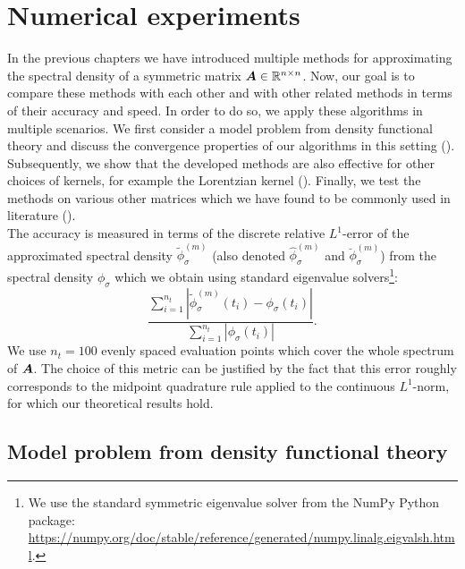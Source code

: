 \chapter{Numerical experiments}
\label{chp:5-experiments}

In the previous chapters we have introduced multiple methods for approximating the
spectral density of a symmetric matrix $\boldsymbol{A} \in \mathbb{R}^{n \times n}$. Now,
our goal is to compare these methods with each other and with other related methods
in terms of their accuracy and speed. In order to do so, we apply these algorithms
in multiple scenarios. We first consider a model problem from density functional theory
\cite{lin2017randomized} and discuss the convergence properties of our algorithms
in this setting (). Subsequently,
we show that the developed methods are also effective for other choices of
kernels, for example the Lorentzian kernel ().
Finally, we test the methods on various other matrices which we have found to
be commonly used in literature ().\\

The accuracy is measured in terms of the discrete relative $L^1$-error of the approximated
spectral density $\widetilde{\phi}_{\sigma}^{(m)}$ (also denoted $\widehat{\phi}_{\sigma}^{(m)}$ and
$\breve{\phi}_{\sigma}^{(m)}$) from the spectral density $\phi_{\sigma}$
which we obtain using standard eigenvalue solvers\footnote{We use the
standard symmetric eigenvalue solver from the NumPy Python package: \url{https://numpy.org/doc/stable/reference/generated/numpy.linalg.eigvalsh.html}.}:
\begin{equation}
    \frac{\sum_{i=1}^{n_t} |\widetilde{\phi}_{\sigma}^{(m)}(t_i) - \phi_{\sigma}(t_i)|}{\sum_{i=1}^{n_t} |\phi_{\sigma}(t_i)|}.
    \label{equ:5-experiments-L1-error}
\end{equation}
We use $n_t=100$ evenly spaced evaluation points which cover the whole spectrum of
$\boldsymbol{A}$. The choice of this metric can be justified by the fact that this
error roughly corresponds to the midpoint quadrature rule %
applied to the continuous $L^1$-norm, for which our theoretical results hold.


\section{Model problem from density functional theory}
\label{sec:5-experiments-density-function}

